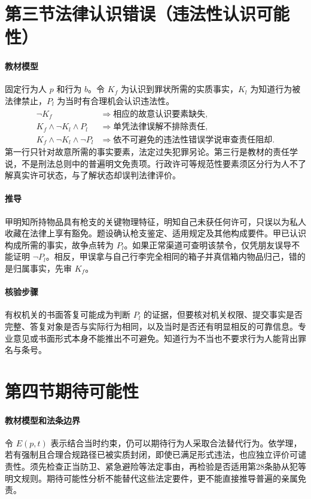 \section{第三节\quad 法律认识错误（违法性认识可能性）}

\paragraph{教材模型}
固定行为人 \(p\) 和行为 \(b\)。令 \(K_f\) 为认识到罪状所需的实质事实，\(K_l\) 为知道行为被法律禁止，\(P_l\) 为当时有合理机会认识违法性。
\[
\begin{aligned}
\neg K_f &\Longrightarrow \text{相应的故意认识要素缺失},\\
K_f\land\neg K_l\land P_l &\Longrightarrow
   \text{单凭法律误解不排除责任},\\
K_f\land\neg K_l\land\neg P_l &\Longrightarrow
   \text{依不可避免的违法性错误学说审查责任阻却}.
\end{aligned}
\]
第一行只针对故意所需的事实要素，法定过失犯罪另论。第三行是教材的责任学说，不是刑法总则中的普遍明文免责项。行政许可等规范性要素须区分行为人不了解真实许可状态，与了解状态却误判法律评价。

\paragraph{推导}
甲明知所持物品具有枪支的关键物理特征，明知自己未获任何许可，只误以为私人收藏在法律上享有豁免。题设确认枪支鉴定、适用规定及其他构成要件。甲已认识构成所需的事实，故争点转为 \(P_l\)。如果正常渠道可查明该禁令，仅凭朋友误导不能证明 \(\neg P_l\)。相反，甲误拿与自己行李完全相同的箱子并真信箱内物品归己，错的是归属事实，先审 \(K_f\)。

\paragraph{核验步骤}
有权机关的书面答复可能成为判断 \(P_l\) 的证据，但要核对机关权限、提交事实是否完整、答复对象是否与实际行为相同，以及当时是否还有明显相反的可靠信息。专业意见或书面形式本身不能推出不可避免。知道行为不当也不要求行为人能背出罪名与条号。

\section{第四节\quad 期待可能性}

\paragraph{教材模型和法条边界}
令 \(E(p,t)\) 表示结合当时约束，仍可以期待行为人采取合法替代行为。依学理，若有强制且合理合规路径已被实质封闭，即使已满足形式违法，也应独立评价可谴责性。须先检查正当防卫、紧急避险等法定事由，再检验是否适用第28条胁从犯等明文规则。期待可能性分析不能替代这些法定要件，更不能直接推导普遍的亲属免责。

